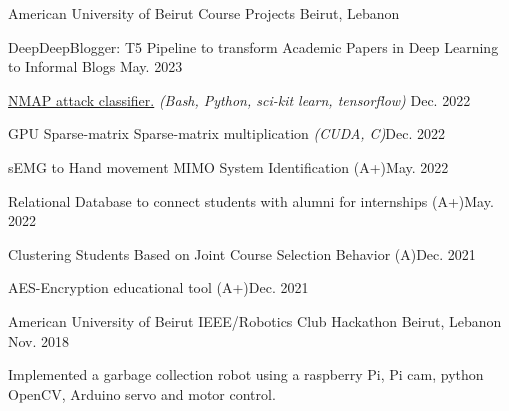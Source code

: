 \begin{cventries}
  \cventry
    {American University of Beirut} %
    {Course Projects} %
    {Beirut, Lebanon} %
    { } %
    {
      \begin{cvitems} %
        \item DeepDeepBlogger: T5 Pipeline to transform Academic Papers in Deep Learning to Informal Blogs \hfill May. 2023
        \item \href{https://github.com/Saiid2001/eece655-final-project}{NMAP attack classifier.} \textit{(Bash, Python, sci-kit learn, tensorflow)} \hfill Dec. 2022
        \item GPU Sparse-matrix Sparse-matrix multiplication \textit{(CUDA, C)}\hfill Dec. 2022
        \item sEMG to Hand movement MIMO System Identification (A+)\hfill May. 2022
        \item Relational Database to connect students with alumni for internships (A+)\hfill May. 2022
        \item Clustering Students Based on Joint Course Selection Behavior (A)\hfill Dec. 2021
        \item AES-Encryption educational tool (A+)\hfill Dec. 2021
      \end{cvitems}
    }


  \cventry
    {American University of Beirut} %
    {IEEE/Robotics Club Hackathon} %
    {Beirut, Lebanon} %
    {Nov. 2018} %
    {
      \begin{cvitems} %
        \item Implemented a garbage collection robot using a raspberry Pi, Pi cam, python OpenCV, Arduino servo and motor control.
      \end{cvitems}
    }

\end{cventries}
